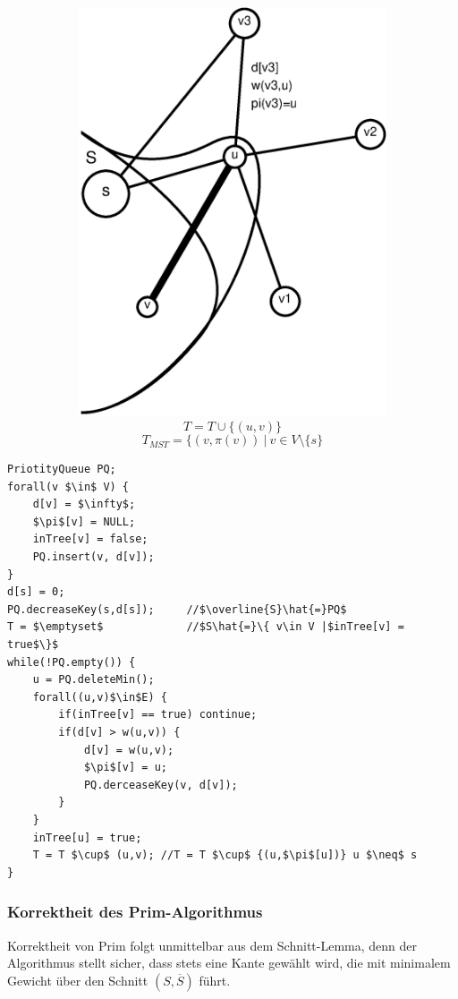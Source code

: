 \begin{figure}[H]
\begin{subfigure}[h]{0.4\textwidth}
	\includegraphics[width=\linewidth]{20/Grafik/img3}
	\[ T=T\cup \{ (u,v) \} \]
	\[ T_{MST}=\{ (v,\pi(v))~|~v\in V\setminus\{ s \} \]
\end{subfigure}
\end{figure}

\begin{lstlisting}
PriotityQueue PQ;
forall(v $\in$ V) {
	d[v] = $\infty$;
	$\pi$[v] = NULL;
	inTree[v] = false;
	PQ.insert(v, d[v]);
}
d[s] = 0;
PQ.decreaseKey(s,d[s]);		//$\overline{S}\hat{=}PQ$
T = $\emptyset$				//$S\hat{=}\{ v\in V |$inTree[v] = true$\}$
while(!PQ.empty()) {
	u = PQ.deleteMin();
	forall((u,v)$\in$E) {
		if(inTree[v] == true) continue;
		if(d[v] > w(u,v)) {
			d[v] = w(u,v);
			$\pi$[v] = u;
			PQ.derceaseKey(v, d[v]);
		}
	}
	inTree[u] = true;
	T = T $\cup$ (u,v);	//T = T $\cup$ {(u,$\pi$[u])} u $\neq$ s
}
\end{lstlisting}
\subsubsection{Korrektheit des Prim-Algorithmus}
Korrektheit von Prim folgt unmittelbar aus dem Schnitt-Lemma, denn der Algorithmus stellt sicher, dass stets eine Kante gewählt wird, die mit minimalem Gewicht über den Schnitt $(S,\overline{S})$ führt.
